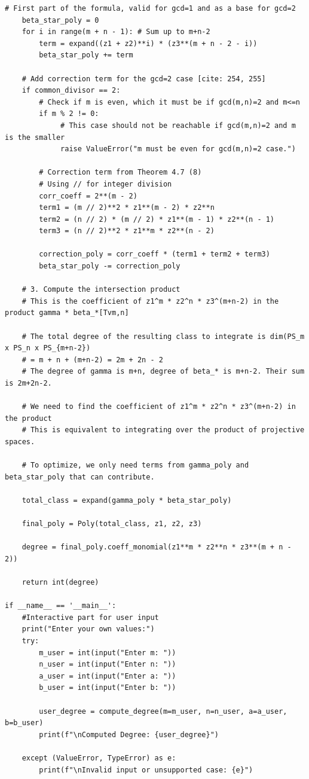 \documentclass[reqno, 11pt]{amsart}
\theoremstyle{plain}
\theoremstyle{remark}
\begin{document}
\begin{lstlisting}[basicstyle=\ttfamily\tiny]
    # First part of the formula, valid for gcd=1 and as a base for gcd=2 
    beta_star_poly = 0
    for i in range(m + n - 1): # Sum up to m+n-2
        term = expand((z1 + z2)**i) * (z3**(m + n - 2 - i))
        beta_star_poly += term

    # Add correction term for the gcd=2 case [cite: 254, 255]
    if common_divisor == 2:
        # Check if m is even, which it must be if gcd(m,n)=2 and m<=n
        if m % 2 != 0:
             # This case should not be reachable if gcd(m,n)=2 and m is the smaller
             raise ValueError("m must be even for gcd(m,n)=2 case.")

        # Correction term from Theorem 4.7 (8)
        # Using // for integer division
        corr_coeff = 2**(m - 2)
        term1 = (m // 2)**2 * z1**(m - 2) * z2**n
        term2 = (n // 2) * (m // 2) * z1**(m - 1) * z2**(n - 1)
        term3 = (n // 2)**2 * z1**m * z2**(n - 2)

        correction_poly = corr_coeff * (term1 + term2 + term3)
        beta_star_poly -= correction_poly

    # 3. Compute the intersection product
    # This is the coefficient of z1^m * z2^n * z3^(m+n-2) in the product gamma * beta_*[Tvm,n]

    # The total degree of the resulting class to integrate is dim(PS_m x PS_n x PS_{m+n-2})
    # = m + n + (m+n-2) = 2m + 2n - 2
    # The degree of gamma is m+n, degree of beta_* is m+n-2. Their sum is 2m+2n-2.

    # We need to find the coefficient of z1^m * z2^n * z3^(m+n-2) in the product
    # This is equivalent to integrating over the product of projective spaces.

    # To optimize, we only need terms from gamma_poly and beta_star_poly that can contribute.

    total_class = expand(gamma_poly * beta_star_poly)

    final_poly = Poly(total_class, z1, z2, z3)

    degree = final_poly.coeff_monomial(z1**m * z2**n * z3**(m + n - 2))

    return int(degree)

if __name__ == '__main__':
    #Interactive part for user input
    print("Enter your own values:")
    try:
        m_user = int(input("Enter m: "))
        n_user = int(input("Enter n: "))
        a_user = int(input("Enter a: "))
        b_user = int(input("Enter b: "))

        user_degree = compute_degree(m=m_user, n=n_user, a=a_user, b=b_user)
        print(f"\nComputed Degree: {user_degree}")

    except (ValueError, TypeError) as e:
        print(f"\nInvalid input or unsupported case: {e}")

\end{lstlisting}



  
\end{document}
